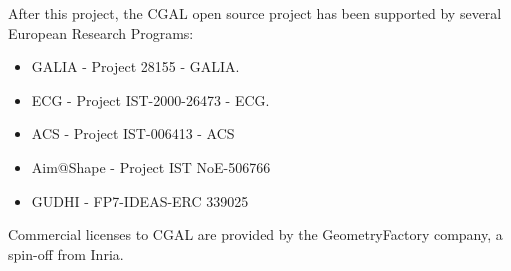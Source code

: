 After this project, the CGAL open source project has been supported by several European Research Programs:
\begin{itemize}
\item GALIA - Project 28155 - GALIA.
\item ECG -  Project IST-2000-26473 - ECG.
\item ACS - Project IST-006413 - ACS
\item Aim@Shape - Project IST NoE-506766
\item GUDHI - FP7-IDEAS-ERC 339025
\end{itemize}

Commercial licenses to CGAL are provided by the GeometryFactory company, a spin-off from Inria.


